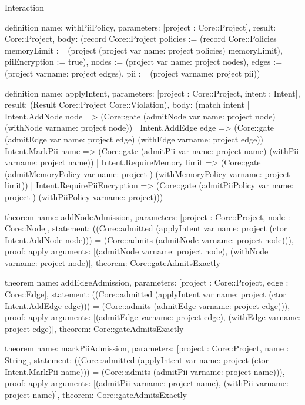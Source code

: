 \begin{lexlean}{Interaction}
\begin{semanticmodule}
definition{
  name: withPiiPolicy,
  parameters: [project : Core::Project],
  result: Core::Project,
  body: (record Core::Project {policies := (record Core::Policies {memoryLimit := (project (project var{
    name: project
  } policies) memoryLimit), piiEncryption := true}), nodes := (project var{
    name: project
  } nodes), edges := (project var{name: project} edges), pii := (project var{name: project} pii)})
}

definition{
  name: applyIntent,
  parameters: [project : Core::Project, intent : Intent],
  result: (Result Core::Project Core::Violation),
  body: (match intent
    | Intent.AddNode node => (Core::gate (admitNode var{
      name: project
    } node) (withNode var{name: project} node))
    | Intent.AddEdge edge => (Core::gate (admitEdge var{
      name: project
    } edge) (withEdge var{name: project} edge))
    | Intent.MarkPii name => (Core::gate (admitPii var{
      name: project
    } name) (withPii var{name: project} name))
    | Intent.RequireMemory limit => (Core::gate (admitMemoryPolicy var{
      name: project
    }) (withMemoryPolicy var{name: project} limit))
    | Intent.RequirePiiEncryption => (Core::gate (admitPiiPolicy var{
      name: project
    }) (withPiiPolicy var{name: project})))
}

theorem{
  name: addNodeAdmission,
  parameters: [project : Core::Project, node : Core::Node],
  statement: ((Core::admitted (applyIntent var{
    name: project
  } (ctor Intent.AddNode node))) = (Core::admits (admitNode var{name: project} node))),
  proof: apply{
    arguments: [(admitNode var{name: project} node), (withNode var{name: project} node)],
    theorem: Core::gateAdmitsExactly
  }
}

theorem{
  name: addEdgeAdmission,
  parameters: [project : Core::Project, edge : Core::Edge],
  statement: ((Core::admitted (applyIntent var{
    name: project
  } (ctor Intent.AddEdge edge))) = (Core::admits (admitEdge var{name: project} edge))),
  proof: apply{
    arguments: [(admitEdge var{name: project} edge), (withEdge var{name: project} edge)],
    theorem: Core::gateAdmitsExactly
  }
}

theorem{
  name: markPiiAdmission,
  parameters: [project : Core::Project, name : String],
  statement: ((Core::admitted (applyIntent var{
    name: project
  } (ctor Intent.MarkPii name))) = (Core::admits (admitPii var{name: project} name))),
  proof: apply{
    arguments: [(admitPii var{name: project} name), (withPii var{name: project} name)],
    theorem: Core::gateAdmitsExactly
  }
}


\end{semanticmodule}
\end{lexlean}
